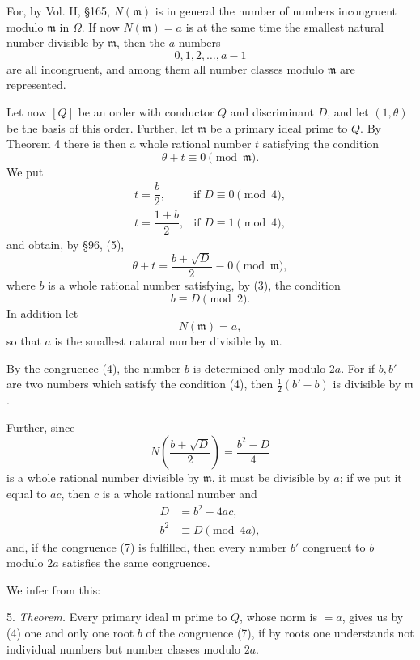 \documentclass[11pt]{article}
\begin{document}
For, by Vol. II, \S 165, $N(\mathfrak m)$ is in general the number of numbers incongruent modulo $\mathfrak m$ in $\Omega$. If now $N(\mathfrak m)=a$ is at the same time the smallest natural number divisible by $\mathfrak m$, then the $a$ numbers
\[
 0,1,2,\ldots,a-1
\]
are all incongruent, and among them all number classes modulo $\mathfrak m$ are represented.

Let now $[Q]$ be an order with conductor $Q$ and discriminant $D$, and let $(1,\theta)$ be the basis of this order. Further, let $\mathfrak m$ be a primary ideal prime to $Q$. By Theorem 4 there is then a whole rational number $t$ satisfying the condition
\[
 \theta+t\equiv0\pmod{\mathfrak m}.
\]
We put
\begin{equation}
\begin{array}{ll}
 t=\dfrac{b}{2}, & \text{if }D\equiv0\pmod4,\\[0.8em]
 t=\dfrac{1+b}{2}, & \text{if }D\equiv1\pmod4,
\end{array}
\tag{3}
\end{equation}
and obtain, by \S 96, (5),
\begin{equation}
 \theta+t=\frac{b+\sqrt D}{2}\equiv0\pmod{\mathfrak m},
\tag{4}
\end{equation}
where $b$ is a whole rational number satisfying, by (3), the condition
\[
 b\equiv D\pmod2.
\]
In addition let
\begin{equation}
 N(\mathfrak m)=a,
\tag{5}
\end{equation}
so that $a$ is the smallest natural number divisible by $\mathfrak m$.

By the congruence (4), the number $b$ is determined only modulo $2a$. For if $b,b'$ are two numbers which satisfy the condition (4), then $\frac12(b'-b)$ is divisible by $\mathfrak m$.

Further, since
\[
 N\left(\frac{b+\sqrt D}{2}\right)=\frac{b^2-D}{4}
\]
is a whole rational number divisible by $\mathfrak m$, it must be divisible by $a$; if we put it equal to $ac$, then $c$ is a whole rational number and
\begin{align}
 D&=b^2-4ac,
\tag{6}\\
 b^2&\equiv D\pmod{4a},
\tag{7}
\end{align}
and, if the congruence (7) is fulfilled, then every number $b'$ congruent to $b$ modulo $2a$ satisfies the same congruence.

We infer from this:

5. \emph{Theorem.} Every primary ideal $\mathfrak m$ prime to $Q$, whose norm is $=a$, gives us by (4) one and only one root $b$ of the congruence (7), if by roots one understands not individual numbers but number classes modulo $2a$.
\end{document}
